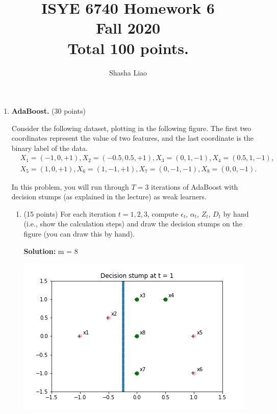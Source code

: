 \documentclass[twoside,10pt]{article}
\begin{document}
\title{ISYE 6740 Homework 6\\ 
Fall 2020\\
\small Total 100 points.}
\date{}
\author{Shasha Liao}
\maketitle







\begin{enumerate}


\item  {\bf AdaBoost.} (30 points)

Consider the following dataset, plotting in the following figure. The first two coordinates represent the value of two features, and the last coordinate is the binary label of the data.
\begin{equation*}
\begin{split}
&X_1 = (-1, 0, +1), X_2 = (-0.5, 0.5, +1), X_3 = (0, 1, -1), X_4 = (0.5, 1, -1), \\
&X_5 = (1, 0, +1), X_6 = (1, -1, +1), X_7 = (0, -1, -1), X_8 = (0, 0, -1).
\end{split}
\end{equation*}

In this problem, you will run through $T = 3$ iterations of AdaBoost with decision stumps (as explained in the lecture) as weak learners.

\begin{enumerate}
\item (15 points) For each iteration $t = 1, 2, 3$, compute $\epsilon_t$, $\alpha_t$, $Z_t$, $D_t$ by hand (i.e., show the calculation steps) and draw the decision stumps on the figure (you can draw this by hand). 
\begin{tcolorbox}
\textbf{Solution:}
m = 8
\begin{center}
\includegraphics[width =0.5 \textwidth]{images/time1.jpg} 
\end{center}
\begin{itemize}



\end{itemize}
\end{tcolorbox}
\end{enumerate}
\end{enumerate}
\end{document}
